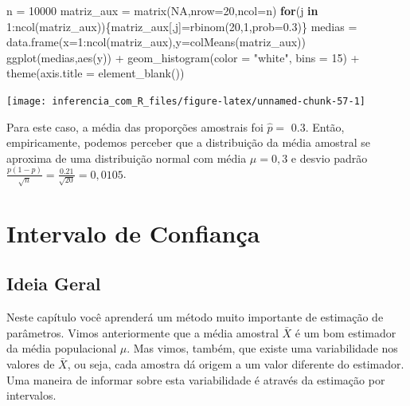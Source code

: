 \documentclass[
]{book}
\newenvironment{Shaded}{\begin{snugshade}}{\end{snugshade}}
\newcommand{\AttributeTok}[1]{\textcolor[rgb]{0.77,0.63,0.00}{#1}}
\newcommand{\ConstantTok}[1]{\textcolor[rgb]{0.00,0.00,0.00}{#1}}
\newcommand{\ControlFlowTok}[1]{\textcolor[rgb]{0.13,0.29,0.53}{\textbf{#1}}}
\newcommand{\DecValTok}[1]{\textcolor[rgb]{0.00,0.00,0.81}{#1}}
\newcommand{\FloatTok}[1]{\textcolor[rgb]{0.00,0.00,0.81}{#1}}
\newcommand{\FunctionTok}[1]{\textcolor[rgb]{0.00,0.00,0.00}{#1}}
\newcommand{\NormalTok}[1]{#1}
\newcommand{\OtherTok}[1]{\textcolor[rgb]{0.56,0.35,0.01}{#1}}
\newcommand{\SpecialCharTok}[1]{\textcolor[rgb]{0.00,0.00,0.00}{#1}}
\newcommand{\StringTok}[1]{\textcolor[rgb]{0.31,0.60,0.02}{#1}}
\begin{document}
\begin{Shaded}
\begin{Highlighting}[]
\NormalTok{n }\OtherTok{=} \DecValTok{10000}
\NormalTok{matriz\_aux }\OtherTok{=} \FunctionTok{matrix}\NormalTok{(}\ConstantTok{NA}\NormalTok{,}\AttributeTok{nrow=}\DecValTok{20}\NormalTok{,}\AttributeTok{ncol=}\NormalTok{n)}
\ControlFlowTok{for}\NormalTok{(j }\ControlFlowTok{in} \DecValTok{1}\SpecialCharTok{:}\FunctionTok{ncol}\NormalTok{(matriz\_aux))\{matriz\_aux[,j]}\OtherTok{=}\FunctionTok{rbinom}\NormalTok{(}\DecValTok{20}\NormalTok{,}\DecValTok{1}\NormalTok{,}\AttributeTok{prob=}\FloatTok{0.3}\NormalTok{)\}}
\NormalTok{medias }\OtherTok{=} \FunctionTok{data.frame}\NormalTok{(}\AttributeTok{x=}\DecValTok{1}\SpecialCharTok{:}\FunctionTok{ncol}\NormalTok{(matriz\_aux),}\AttributeTok{y=}\FunctionTok{colMeans}\NormalTok{(matriz\_aux))}
\FunctionTok{ggplot}\NormalTok{(medias,}\FunctionTok{aes}\NormalTok{(y)) }\SpecialCharTok{+}
  \FunctionTok{geom\_histogram}\NormalTok{(}\AttributeTok{color =} \StringTok{"white"}\NormalTok{, }\AttributeTok{bins =} \DecValTok{15}\NormalTok{) }\SpecialCharTok{+}
  \FunctionTok{theme}\NormalTok{(}\AttributeTok{axis.title =} \FunctionTok{element\_blank}\NormalTok{())}
\end{Highlighting}
\end{Shaded}

\begin{center}\texttt{[image: inferencia\_com\_R\_files/figure-latex/unnamed-chunk-57-1]} \end{center}

Para este caso, a média das proporções amostrais foi \(\hat p=\) 0.3. Então, empiricamente, podemos perceber que a distribuição da média amostral se aproxima de uma distribuição normal com média \(\mu=0,3\) e desvio padrão \(\frac{p(1-p)}{\sqrt{n}}=\frac{0.21}{\sqrt{20}}=0,0105\).

\hypertarget{intervalo-de-confianuxe7a}{%
\chapter{Intervalo de Confiança}\label{intervalo-de-confianuxe7a}}

\hypertarget{ideia-geral}{%
\section{Ideia Geral}\label{ideia-geral}}

Neste capítulo você aprenderá um método muito importante de estimação de parâmetros. Vimos anteriormente que a média amostral \(\bar X\) é um bom estimador da média populacional \(\mu\). Mas vimos, também, que existe uma variabilidade nos valores de \(\bar X\), ou seja, cada amostra dá origem a um valor diferente do estimador. Uma maneira de informar sobre esta variabilidade é através da estimação por intervalos.
\end{document}
